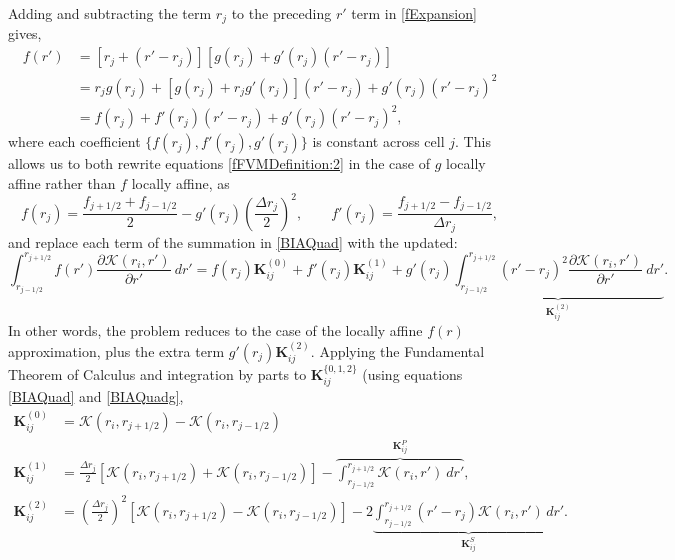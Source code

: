 \documentclass[11pt,a4paper]{article}
\begin{document}
	Adding and subtracting the term $r_j$ to the preceding $r'$ term in \eqref{fExpansion} gives,
	\begin{equation}
		\label{fAddSubtract}
		\begin{aligned}
			f(r') &= \left[r_j + (r' - r_j)\right]\left[g(r_j) + g'(r_j)(r' - r_j)\right] \\
			&= r_j g(r_j) + \left[g(r_j) + r_j g'(r_j)\right](r' - r_j) + g'(r_j)(r' - r_j)^2 \\
			&= f(r_j) + f'(r_j) (r'-r_j) + g'(r_j)(r'-r_j)^2,
		\end{aligned}
	\end{equation}
	where each coefficient $\{f(r_j), f'(r_j), g'(r_j)\}$ is constant across cell $j$. This allows us to both rewrite equations \eqref{fFVMDefinition:2} in the case of $g$ locally affine rather than $f$ locally affine, as
	\begin{equation}
		\label{gFVMDefinition}
		f(r_j) = \frac{f_{j+1/2} + f_{j-1/2}}{2} - g'(r_j)\left(\frac{\Delta r_j}{2}\right)^2, \qquad f'(r_j) = \frac{f_{j+1/2} - f_{j-1/2}}{\Delta r_j},
	\end{equation}
	and replace each term of the summation in \eqref{BIAQuad} with the updated:
	\begin{equation}
		\label{BIAQuadg}
		\int^{r_{j+1/2}}_{r_{j-1/2}} f(r') \frac{\partial \mathcal{K}(r_i, r')}{\partial r'}\ dr' = f(r_j)\mathbf{K}^{(0)}_{ij} + f'(r_j)\mathbf{K}^{(1)}_{ij} + g'(r_j)\underbrace{\int^{r_{j+1/2}}_{r_{j-1/2}} (r'-r_j)^2 \frac{\partial \mathcal{K}(r_i, r')}{\partial r'}\ dr'}_{\mathbf{K}^{(2)}_{ij}}.
	\end{equation}
	In other words, the problem reduces to the case of the locally affine $f(r)$ approximation, plus the extra term $g'(r_j)\mathbf{K}^{(2)}_{ij}$. Applying the Fundamental Theorem of Calculus and integration by parts to $\mathbf{K}^{\{0, 1, 2\}}_{ij}$ (using equations \eqref{BIAQuad} and \eqref{BIAQuadg},
	\begin{subequations}
		\label{KIntegralByParts}
		\begin{align}	
			\mathbf{K}^{(0)}_{ij} &= \mathcal{K}(r_i, r_{j+1/2}) - \mathcal{K}(r_i, r_{j-1/2}) \\[-10pt]
			\mathbf{K}^{(1)}_{ij} &= \frac{\Delta r_j}{2}\left[\mathcal{K}(r_i,r_{j+1/2}) + \mathcal{K}(r_i,r_{j-1/2})\right] - \overbrace{\int^{r_{j+1/2}}_{r_{j-1/2}} \mathcal{K}(r_i,r')\ dr'}^{\mathbf{K}^P_{ij}}, \label{KIntegralByParts:1} \\
			\mathbf{K}^{(2)}_{ij} &= \left(\frac{\Delta r_j}{2}\right)^2\left[\mathcal{K}(r_i, r_{j+1/2}) - \mathcal{K}(r_i, r_{j-1/2})\right] - 2 \underbrace{\int_{r_{j-1/2}}^{r_{j+1/2}} (r' - r_j)\mathcal{K}(r_i, r')\, dr'}_{\mathbf{K}^{S}_{ij}}. \label{KIntegralByParts:2}
		\end{align}
	\end{subequations}
\end{document}
